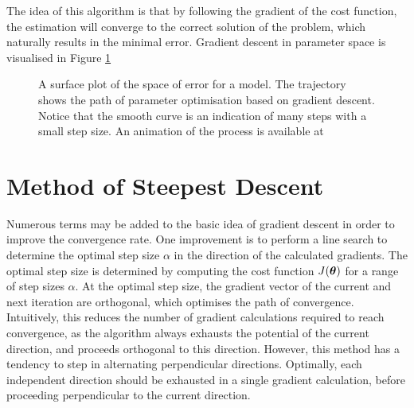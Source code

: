 The idea of this algorithm is that by following the gradient of the cost function,
the estimation will converge to the correct solution of the problem,
which naturally results in the minimal error.
Gradient descent in parameter space is visualised in Figure \ref{fig:GD_surface}

\begin{figure}[h!]
    \centering
    
    \caption{A surface plot of the space of error for a model. The trajectory shows the path of parameter optimisation based on gradient descent.
        Notice that the smooth curve is an indication of many steps with a small step size. An animation of the process is available at %
    }
    \label{fig:GD_surface}
\end{figure}


\section{Method of Steepest Descent}\label{sec:theory_MSD}
Numerous terms may be added to the basic idea of gradient descent in order to improve the convergence rate.
One improvement is to perform  a line search to determine the optimal step size $\alpha$ in the direction of the calculated gradients.
The optimal step size is determined by computing the cost function $J(\mathrm{\boldsymbol{\theta}})$ for a range of step sizes $\alpha$.
At the optimal step size, the gradient vector of the current and next iteration are orthogonal, which optimises the path of convergence.  %
Intuitively, this reduces the number of gradient calculations required to reach convergence, as the algorithm always exhausts the potential of the current direction, and proceeds orthogonal to this direction.
However, this method has a tendency to step in alternating perpendicular directions. Optimally, each independent direction should be exhausted in a single gradient calculation, before proceeding perpendicular to the current direction.


